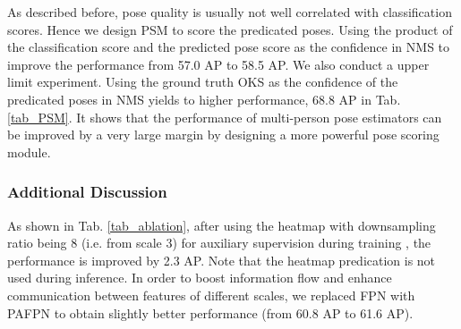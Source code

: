 \documentclass[11pt,twocolumn,journal]{IEEEtran}
\newcommand{\tab}{Tab. }
\begin{document}
As described before, pose quality is usually not well correlated with classification scores. Hence we design PSM to score the predicated poses. Using the product of the classification score and the predicted pose score as the confidence in NMS to improve the performance from 57.0 AP to 58.5 AP. 
We also conduct a upper limit experiment. Using the ground truth OKS as the confidence of the predicated poses in NMS yields to higher performance, 68.8 AP in \tab\ref{tab_PSM}. It shows that the performance of multi-person pose estimators can be improved by a very large margin by designing a more powerful pose scoring module.

\subsubsection{Additional Discussion}
As shown in \tab\ref{tab_ablation}, after using the heatmap with downsampling ratio being 8 (i.e. from scale 3) for auxiliary supervision during training \cite{directpose19}, the performance is improved by 2.3 AP. Note that the heatmap predication is not used during inference. In order to boost information flow and enhance communication between features of different scales, we replaced FPN \cite{fpn17} with PAFPN \cite{liu2018path} to obtain slightly better performance (from 60.8 AP to 61.6 AP).
\end{document}
